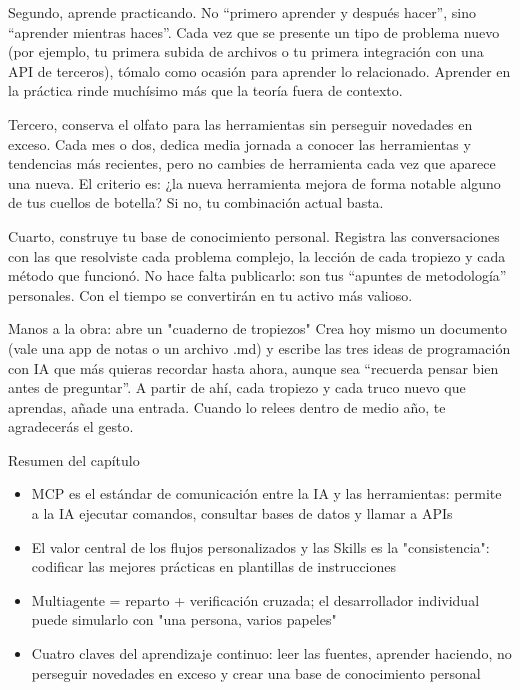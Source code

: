 Segundo, aprende practicando. No “primero aprender y después hacer”, sino “aprender mientras haces”. Cada vez que se presente un tipo de problema nuevo (por ejemplo, tu primera subida de archivos o tu primera integración con una API de terceros), tómalo como ocasión para aprender lo relacionado. Aprender en la práctica rinde muchísimo más que la teoría fuera de contexto.

Tercero, conserva el olfato para las herramientas sin perseguir novedades en exceso. Cada mes o dos, dedica media jornada a conocer las herramientas y tendencias más recientes, pero no cambies de herramienta cada vez que aparece una nueva. El criterio es: ¿la nueva herramienta mejora de forma notable alguno de tus cuellos de botella? Si no, tu combinación actual basta.

Cuarto, construye tu base de conocimiento personal. Registra las conversaciones con las que resolviste cada problema complejo, la lección de cada tropiezo y cada método que funcionó. No hace falta publicarlo: son tus “apuntes de metodología” personales. Con el tiempo se convertirán en tu activo más valioso.

\begin{tcbpractice}{Manos a la obra: abre un "cuaderno de tropiezos"}
Crea hoy mismo un documento (vale una app de notas o un archivo .md) y escribe las tres ideas de programación con IA que más quieras recordar hasta ahora, aunque sea “recuerda pensar bien antes de preguntar”. A partir de ahí, cada tropiezo y cada truco nuevo que aprendas, añade una entrada. Cuando lo relees dentro de medio año, te agradecerás el gesto.

\end{tcbpractice}

\begin{tcbsummary}{Resumen del capítulo}
\begin{itemize}
  \item MCP es el estándar de comunicación entre la IA y las herramientas: permite a la IA ejecutar comandos, consultar bases de datos y llamar a APIs
  \item El valor central de los flujos personalizados y las Skills es la "consistencia": codificar las mejores prácticas en plantillas de instrucciones
  \item Multiagente = reparto + verificación cruzada; el desarrollador individual puede simularlo con "una persona, varios papeles"
  \item Cuatro claves del aprendizaje continuo: leer las fuentes, aprender haciendo, no perseguir novedades en exceso y crear una base de conocimiento personal
\end{itemize}

\end{tcbsummary}
